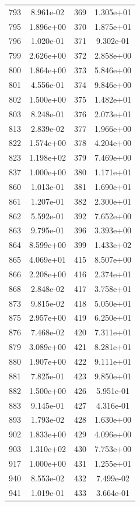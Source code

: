 \documentclass[12pt]{article}
\begin{document}
\begin{longtable}{@{}cccc@{}}
793 & 8.961e-02 & 369 & 1.305e+01 \\
795 & 1.896e+00 & 370 & 1.875e+01 \\
796 & 1.020e-01 & 371 & 9.302e-01 \\
799 & 2.626e+00 & 372 & 2.858e+00 \\
800 & 1.864e+00 & 373 & 5.846e+00 \\
801 & 4.556e-01 & 374 & 9.846e+00 \\
802 & 1.500e+00 & 375 & 1.482e+01 \\
803 & 8.248e-01 & 376 & 2.073e+01 \\
813 & 2.839e-02 & 377 & 1.966e+00 \\
822 & 1.574e+00 & 378 & 4.204e+00 \\
823 & 1.198e+02 & 379 & 7.469e+00 \\
837 & 1.000e+00 & 380 & 1.171e+01 \\
860 & 1.013e-01 & 381 & 1.690e+01 \\
861 & 1.207e-01 & 382 & 2.300e+01 \\
862 & 5.592e-01 & 392 & 7.652e+00 \\
863 & 9.795e-01 & 396 & 3.393e+00 \\
864 & 8.599e+00 & 399 & 1.433e+02 \\
865 & 4.069e+01 & 415 & 8.507e+00 \\
866 & 2.208e+00 & 416 & 2.374e+01 \\
868 & 2.848e-02 & 417 & 3.758e+01 \\
873 & 9.815e-02 & 418 & 5.050e+01 \\
875 & 2.957e+00 & 419 & 6.250e+01 \\
876 & 7.468e-02 & 420 & 7.311e+01 \\
879 & 3.089e+00 & 421 & 8.281e+01 \\
880 & 1.907e+00 & 422 & 9.111e+01 \\
881 & 7.825e-01 & 423 & 9.850e+01 \\
882 & 1.500e+00 & 426 & 5.951e-01 \\
883 & 9.145e-01 & 427 & 4.316e-01 \\
893 & 1.793e-02 & 428 & 1.630e+00 \\
902 & 1.833e+00 & 429 & 4.096e+00 \\
903 & 1.310e+02 & 430 & 7.753e+00 \\
917 & 1.000e+00 & 431 & 1.255e+01 \\
940 & 8.553e-02 & 432 & 7.499e-02 \\
941 & 1.019e-01 & 433 & 3.664e-01 \\

\end{longtable}
\end{document}

